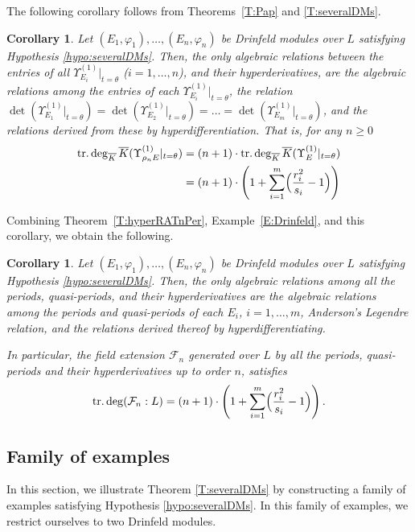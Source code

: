 \documentclass[10pt,a4paper]{amsart}
\theoremstyle{plain} %
\newtheorem{Corollary}[Theorem]{Corollary}
\theoremstyle{definition}
\theoremstyle{remark}
\newcommand{\oK}{\overline{K}}
\newcommand{\trdeg}{\operatorname{tr.deg}}
\numberwithin{equation}{subsection}
\begin{document}
The following corollary follows from  Theorems~\ref{T:Pap} and 
\ref{T:severalDMs}. 
\begin{Corollary}
  Let $(E_1,\varphi_1), \ldots, (E_n,\varphi_n)$ be Drinfeld modules over $L$ satisfying Hypothesis \ref{hypo:severalDMs}. 
  Then, 
the only algebraic relations between the entries of all 
$\Upsilon_{E_i}^{(1)} |_{t=\theta}$ ($i=1,\ldots, n$), and their hyperderivatives, are the algebraic relations among the entries of each 
$\Upsilon_{E_i}^{(1)} |_{t=\theta}$,  the relation $\det(\Upsilon_{E_1}^{(1)} |_{t=\theta})=\det(\Upsilon_{E_2}^{(1)} |_{t=\theta})=\dots = \det(\Upsilon_{E_m}^{(1)} |_{t=\theta})$, and the relations derived from these by hyperdifferentiation. That is, for any $n \geq 0$
\begin{align*}
\trdeg_{\oK}\oK(\Upsilon_{\rho_{n} E}^{(1)}|_{t=\theta}) &= (n+1)\cdot \trdeg_{\oK}\oK(\Upsilon_{E}^{(1)} |_{t=\theta})\\
&= (n+1)\cdot  \left( 1 + \sum_{i=1}^m \Bigl(\frac{r_i^2}{s_i} -1 \Bigr) \right)
\end{align*}
\end{Corollary}


 Combining Theorem~\ref{T:hyperRATnPer}, Example~\ref{E:Drinfeld}, and this corollary, we obtain the following. 

\begin{Corollary}\label{C:trdegSeveralDM} 
    Let $(E_1,\varphi_1), \ldots, (E_n,\varphi_n)$ be Drinfeld modules over $L$ satisfying Hypothesis \ref{hypo:severalDMs}.  
    Then, the only algebraic relations among all the periods, quasi-periods, and their hyperderivatives are the algebraic relations among the periods and quasi-periods of each $E_i$, $i=1,\dots, m$, Anderson's Legendre relation, and the relations derived thereof by hyperdifferentiating.
    
 In particular, the field extension $\mathcal{F}_n$ generated over $L$ by all the periods, quasi-periods and their hyperderivatives up to order $n$, satisfies 
    \[ \trdeg(\mathcal{F}_n:L) = (n+1)\cdot \left( 1 + \sum_{i=1}^m \Bigl(\frac{r_i^2}{s_i} -1 \Bigr) \right). \]
\end{Corollary}


\subsection{Family of examples}\label{SubS:examples}



In this section, we illustrate Theorem \ref{T:severalDMs} by constructing a family of examples satisfying Hypothesis \ref{hypo:severalDMs}.
In this family of examples, we restrict ourselves to two Drinfeld modules. 
\end{document}
